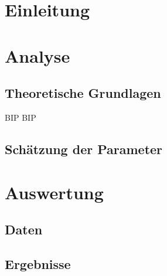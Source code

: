\chapter{Einleitung}
\lipsum

\chapter{Analyse}
\label{chap:analyse}

\section{Theoretische Grundlagen}
\label{sec:grundlagen}
\ac{BIP} \ac{BIP} 

\section{Schätzung der Parameter}
\label{sec:parameterschätzung}
\lipsum

\chapter{Auswertung}
\label{chap:auswertung}

\section{Daten}
\label{sec:daten}
\lipsum

\section{Ergebnisse}
\label{sec:ergebnisse}
\lipsum